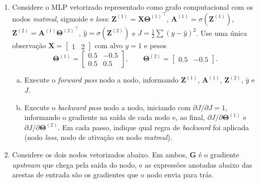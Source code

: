 \documentclass{dlproblemset}
\begin{document}
\begin{enumerate}[1)]
    \item Considere o MLP vetorizado representado como grafo computacional com os nodos \textit{matmul}, sigmoide e \textit{loss}: $\mathbf{Z}^{(1)} = \mathbf{X}{\mathbf{\Theta}^{(1)}}^{\top}$, $\mathbf{A}^{(1)} = \sigma(\mathbf{Z}^{(1)})$, $\mathbf{Z}^{(2)} = \mathbf{A}^{(1)}{\mathbf{\Theta}^{(2)}}^{\top}$, $\hat{y} = \sigma(\mathbf{Z}^{(2)})$ e $J = \tfrac{1}{2}\sum\left(y - \hat{y}\right)^{2}$. Use uma única observação $\mathbf{X} = \begin{bmatrix} 1 & 2 \end{bmatrix}$ com alvo $y = 1$ e pesos
    $$\mathbf{\Theta}^{(1)} = \begin{bmatrix} 0.5 & -0.5 \\ 0.5 & 0.5 \end{bmatrix}, \qquad \mathbf{\Theta}^{(2)} = \begin{bmatrix} 0.5 & -0.5 \end{bmatrix}.$$
    \begin{enumerate}[a)]
        \item Execute o \textit{forward pass} nodo a nodo, informando $\mathbf{Z}^{(1)}$, $\mathbf{A}^{(1)}$, $\mathbf{Z}^{(2)}$, $\hat{y}$ e $J$.
        \item Execute o \textit{backward pass} nodo a nodo, iniciando com $\partial J/\partial J = 1$, informando o gradiente na saída de cada nodo e, ao final, $\partial J/\partial \mathbf{\Theta}^{(1)}$ e $\partial J/\partial \mathbf{\Theta}^{(2)}$. Em cada passo, indique qual regra de \textit{backward} foi aplicada (nodo \textit{loss}, nodo de ativação ou nodo \textit{matmul}).
    \end{enumerate}

    \item Considere os dois nodos vetorizados abaixo. Em ambos, $\mathbf{G}$ é o gradiente \textit{upstream} que chega pela saída do nodo, e as expressões anotadas abaixo das arestas de entrada são os gradientes que o nodo envia para trás.


\end{enumerate}
\end{document}
